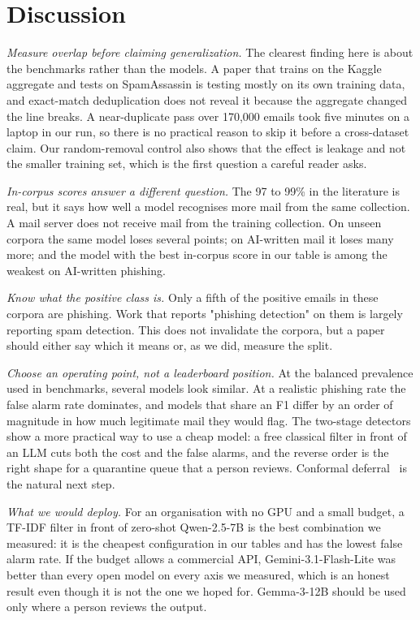 \section{Discussion}

\textit{Measure overlap before claiming generalization.} The clearest finding
here is about the benchmarks rather than the models. A paper that trains on the
Kaggle aggregate and tests on SpamAssassin is testing mostly on its own
training data, and exact-match deduplication does not reveal it because the
aggregate changed the line breaks. A near-duplicate pass over 170{,}000 emails
took five minutes on a laptop in our run, so there is no practical reason to
skip it before a cross-dataset claim. Our random-removal control also shows
that the effect is leakage and not the smaller training set, which is the first
question a careful reader asks.

\textit{In-corpus scores answer a different question.} The 97 to 99\% in the
literature is real, but it says how well a model recognises more mail from the
same collection. A mail server does not receive mail from the training
collection. On unseen corpora the same model loses several points; on
AI-written mail it loses many more; and the model with the best in-corpus score
in our table is among the weakest on AI-written phishing.

\textit{Know what the positive class is.} Only a fifth of the positive emails
in these corpora are phishing. Work that reports "phishing detection" on them
is largely reporting spam detection. This does not invalidate the corpora, but
a paper should either say which it means or, as we did, measure the split.

\textit{Choose an operating point, not a leaderboard position.} At the balanced
prevalence used in benchmarks, several models look similar. At a realistic
phishing rate the false alarm rate dominates, and models that share an F1
differ by an order of magnitude in how much legitimate mail they would flag.
The two-stage detectors show a more practical way to use a cheap model: a free
classical filter in front of an LLM cuts both the cost and the false alarms,
and the reverse order is the right shape for a quarantine queue that a person
reviews. Conformal deferral~\cite{triage} is the natural next step.

\textit{What we would deploy.} For an organisation with no GPU and a small
budget, a TF-IDF filter in front of zero-shot Qwen-2.5-7B is the best
combination we measured: it is the cheapest configuration in our tables and has
the lowest false alarm rate. If the budget allows a commercial API,
Gemini-3.1-Flash-Lite was better than every open model on every axis we
measured, which is an honest result even though it is not the one we hoped for.
Gemma-3-12B should be used only where a person reviews the output.

